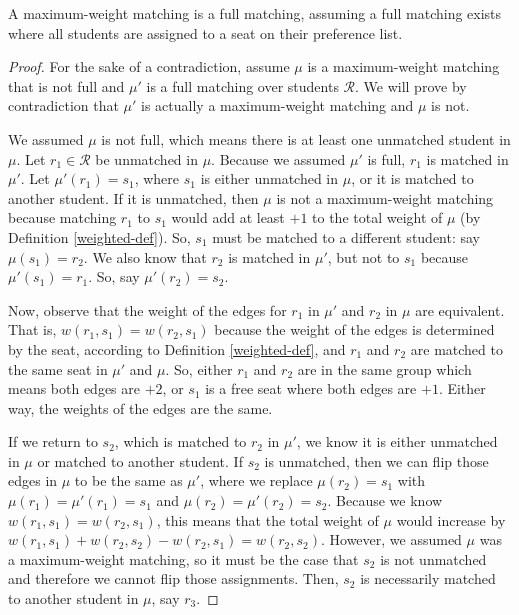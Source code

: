 \begin{theorem} \label{thm:full-weight}
  A maximum-weight matching is a full matching,
  assuming a full matching exists where all students are assigned to a seat on
  their preference list. 
\end{theorem}
\begin{proof}
  For the sake of a contradiction, assume $\mu$ is a maximum-weight
  matching that is not full and $\mu'$ is a full matching over students $\mathcal{R}$. We will
  prove by contradiction that $\mu'$ is actually a maximum-weight matching and
  $\mu$ is not.

  We assumed $\mu$ is not full, which means there is at least one unmatched
  student in $\mu$. Let $r_1 \in \mathcal{R}$ be unmatched in $\mu$. Because we assumed $\mu'$
  is full, $r_1$ is matched in $\mu'$. Let $\mu'(r_1) = s_1$, where $s_1$ is
  either unmatched in $\mu$, or it is matched to another student.
  If it is unmatched, then $\mu$ is not a maximum-weight matching because
  matching $r_1$ to $s_1$ would add at least $+1$ to the total weight of $\mu$
  (by Definition \ref{weighted-def}). So, $s_1$ must be matched to a different
  student: say $\mu(s_1) = r_2$. We also know that $r_2$ is matched in $\mu'$,
  but not to $s_1$ because $\mu'(s_1) = r_1$. So, say $\mu'(r_2) = s_2$. 

  Now, observe that the weight of the edges for $r_1$ in $\mu'$ and $r_2$ in
  $\mu$ are equivalent. That is, $w(r_1, s_1) = w(r_2, s_1)$ because the weight
  of the edges is determined by the seat, according to Definition
  \ref{weighted-def}, and $r_1$ and $r_2$ are matched to the same seat in $\mu'$
  and $\mu$. So, either $r_1$ and $r_2$ are in the same group which means both
  edges are $+2$, or $s_1$ is a free seat where both edges are $+1$. Either way,
  the weights of the edges are the same. 

  If we return to $s_2$, which is matched to $r_2$ in $\mu'$, we know it is
  either unmatched in $\mu$ or matched to another student. If $s_2$ is
  unmatched, then we can flip those edges in $\mu$ to be the same as $\mu'$,
  where we replace $\mu(r_2) = s_1$ with $\mu(r_1) = \mu'(r_1) = s_1$ and
  $\mu(r_2) = \mu'(r_2) =
  s_2$. Because we know $w(r_1, s_1) = w(r_2, s_1)$, this means that the total
  weight of $\mu$ would increase by $w(r_1, s_1) + w(r_2, s_2) - w(r_2, s_1) =
  w(r_2, s_2)$. However, we assumed $\mu$ was a maximum-weight matching, so it
  must be the case that $s_2$ is not unmatched and therefore we cannot flip
  those assignments. Then, $s_2$ is necessarily matched to another student in
  $\mu$, say $r_3$. 


\end{proof}
